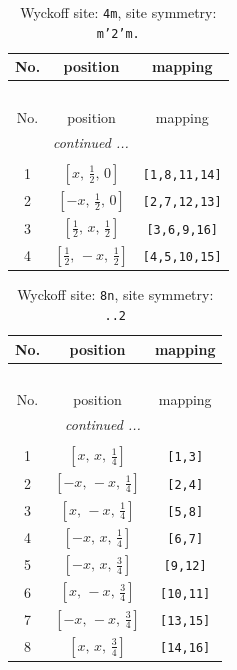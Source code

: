 \documentclass[fleqn,8pt]{jsarticle}
\begin{document}
\renewcommand{\arraystretch}{1.2}
\begin{longtable}{ccc}
\caption{Wyckoff site: {\tt 4m}, site symmetry: {\tt m'2'm.}}
 \\
 \hline \hline
No. & position & mapping \\ \hline \endfirsthead

\multicolumn{2}{l}{\tablename\ \thetable{}} \\
 \hline \hline
No. & position & mapping \\ \hline \endhead

 \hline \hline
\multicolumn{2}{r}{\footnotesize\it continued ...} \\ \endfoot

 \hline \hline
\multicolumn{2}{r}{} \\ \endlastfoot

1 & $\left[ x,\, \frac{1}{2},\, 0 \right]$ & {\tt [1,8,11,14]} \\ \hline
2 & $\left[ - x,\, \frac{1}{2},\, 0 \right]$ & {\tt [2,7,12,13]} \\ \hline
3 & $\left[ \frac{1}{2},\, x,\, \frac{1}{2} \right]$ & {\tt [3,6,9,16]} \\ \hline
4 & $\left[ \frac{1}{2},\, - x,\, \frac{1}{2} \right]$ & {\tt [4,5,10,15]} \\
\end{longtable}
\renewcommand{\arraystretch}{1.2}
\begin{longtable}{ccc}
\caption{Wyckoff site: {\tt 8n}, site symmetry: {\tt ..2}}
 \\
 \hline \hline
No. & position & mapping \\ \hline \endfirsthead

\multicolumn{2}{l}{\tablename\ \thetable{}} \\
 \hline \hline
No. & position & mapping \\ \hline \endhead

 \hline \hline
\multicolumn{2}{r}{\footnotesize\it continued ...} \\ \endfoot

 \hline \hline
\multicolumn{2}{r}{} \\ \endlastfoot

1 & $\left[ x,\, x,\, \frac{1}{4} \right]$ & {\tt [1,3]} \\ \hline
2 & $\left[ - x,\, - x,\, \frac{1}{4} \right]$ & {\tt [2,4]} \\ \hline
3 & $\left[ x,\, - x,\, \frac{1}{4} \right]$ & {\tt [5,8]} \\ \hline
4 & $\left[ - x,\, x,\, \frac{1}{4} \right]$ & {\tt [6,7]} \\ \hline
5 & $\left[ - x,\, x,\, \frac{3}{4} \right]$ & {\tt [9,12]} \\ \hline
6 & $\left[ x,\, - x,\, \frac{3}{4} \right]$ & {\tt [10,11]} \\ \hline
7 & $\left[ - x,\, - x,\, \frac{3}{4} \right]$ & {\tt [13,15]} \\ \hline
8 & $\left[ x,\, x,\, \frac{3}{4} \right]$ & {\tt [14,16]} \\
\end{longtable}
\end{document}
